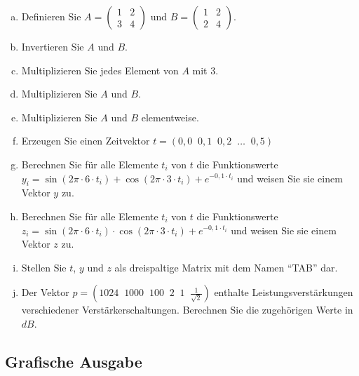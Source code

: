 \begin{enumerate}[a)]
    \item Definieren Sie $A=\begin{pmatrix}1&2\\3&4\end{pmatrix}$ und $B=\begin{pmatrix}1&2\\2&4\end{pmatrix}$.
    \item Invertieren Sie $A$ und $B$.
    \item Multiplizieren Sie jedes Element von $A$ mit $3$.
    \item Multiplizieren Sie $A$ und $B$.
    \item Multiplizieren Sie $A$ und $B$ elementweise.
    \item Erzeugen Sie einen Zeitvektor $t=(0,0 \; \; 0,1 \; \; 0,2 \; \; \dots \; \; 0,5)$
    \item Berechnen Sie für alle Elemente $t_i$ von $t$ die Funktionswerte\\
    $y_i = \sin{(2\pi \cdot 6 \cdot t_i)} + \cos{(2\pi \cdot 3 \cdot t_i)} + e^{-0,1 \cdot t_i}$ und weisen Sie sie einem Vektor $y$ zu.
    \item Berechnen Sie für alle Elemente $t_i$ von $t$ die Funktionswerte\\
    $z_i = \sin{(2\pi \cdot 6 \cdot t_i)} \cdot \cos{(2\pi \cdot 3 \cdot t_i)} + e^{-0,1 \cdot t_i}$ und weisen Sie sie einem Vektor $z$ zu.
    \item Stellen Sie $t$, $y$ und $z$ als dreispaltige Matrix mit dem Namen \enquote{TAB} dar.
    \item Der Vektor $p=(1024 \; \; 1000 \; \; 100 \; \; 2 \; \; 1 \; \; \frac{1}{\sqrt{2}})$ enthalte Leistungsverstärkungen verschiedener Verstärkerschaltungen. Berechnen Sie die zugehörigen Werte in $dB$.
\end{enumerate}

\subsection{Grafische Ausgabe}


